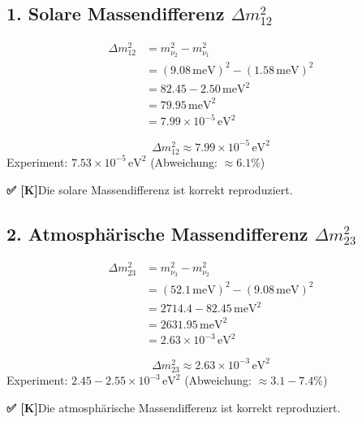 \documentclass[11pt,a4paper]{article}
\newcommand{\Checkmark}{\textbf{✅ [K]}}
\begin{document}
	\subsection{1. Solare Massendifferenz $\Delta m_{12}^2$}
	
	\begin{align}
		\Delta m_{12}^2 &= m_{\nu_2}^2 - m_{\nu_1}^2 \\
		&= (9.08\,\text{meV})^2 - (1.58\,\text{meV})^2 \\
		&= 82.45 - 2.50 \,\text{meV}^2 \\
		&= 79.95 \,\text{meV}^2 \\
		&= 7.99 \times 10^{-5}\,\text{eV}^2
	\end{align}
	
	\begin{tcolorbox}[colback=green!5!white,colframe=green!50!black,title=Solare Massendifferenz -- GELÖST \Checkmark]
		\begin{equation}
			\Delta m_{12}^2 \approx 7.99 \times 10^{-5}\,\text{eV}^2
		\end{equation}
		Experiment: $7.53 \times 10^{-5}\,\text{eV}^2$ (Abweichung: $\approx 6.1\%$)
		
		\Checkmark Die solare Massendifferenz ist korrekt reproduziert.
	\end{tcolorbox}
	
	\subsection{2. Atmosphärische Massendifferenz $\Delta m_{23}^2$}
	
	\begin{align}
		\Delta m_{23}^2 &= m_{\nu_3}^2 - m_{\nu_2}^2 \\
		&= (52.1\,\text{meV})^2 - (9.08\,\text{meV})^2 \\
		&= 2714.4 - 82.45 \,\text{meV}^2 \\
		&= 2631.95 \,\text{meV}^2 \\
		&= 2.63 \times 10^{-3}\,\text{eV}^2
	\end{align}
	
	\begin{tcolorbox}[colback=green!5!white,colframe=green!50!black,title=Atmosphärische Massendifferenz -- GELÖST \Checkmark]
		\begin{equation}
			\Delta m_{23}^2 \approx 2.63 \times 10^{-3}\,\text{eV}^2
		\end{equation}
		Experiment: $2.45 - 2.55 \times 10^{-3}\,\text{eV}^2$ (Abweichung: $\approx 3.1 - 7.4\%$)
		
		\Checkmark Die atmosphärische Massendifferenz ist korrekt reproduziert.
	\end{tcolorbox}
	
\end{document}
